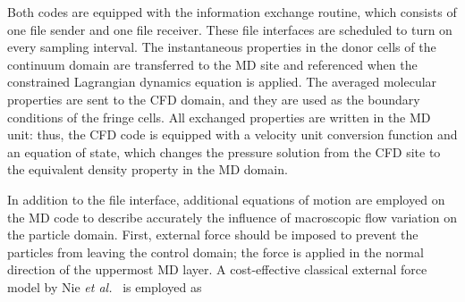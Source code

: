 \documentclass[preprint,12pt]{elsarticle}
\newcommand{\skonote}[1]{ {\textcolor{green} { ***Jeff: #1 }}}
\newcommand{\skonote}[1]{}
\begin{document}

Both codes are equipped with the information exchange routine, which consists of one file sender and one file receiver. These file interfaces are scheduled to turn on every sampling interval. The instantaneous properties in the donor cells of the continuum domain are transferred to the MD site and referenced when the constrained Lagrangian dynamics equation is applied. The averaged molecular properties are sent to the CFD domain, and they are used as the boundary conditions of the fringe cells. All exchanged properties are written in the MD unit: thus, the CFD code is equipped with a velocity unit conversion function and an equation of state, which changes the pressure solution from the CFD site to the equivalent density property in the MD domain.


In addition to the file interface, additional equations of motion are employed on the MD code to describe accurately the influence of macroscopic flow variation on the particle domain. First, external force should be imposed to prevent the particles from leaving the control domain; the force is applied in the normal direction of the uppermost MD layer. A cost-effective classical external force model by Nie {\it{et al.}}~\cite{Nie} is employed as

\end{document}
